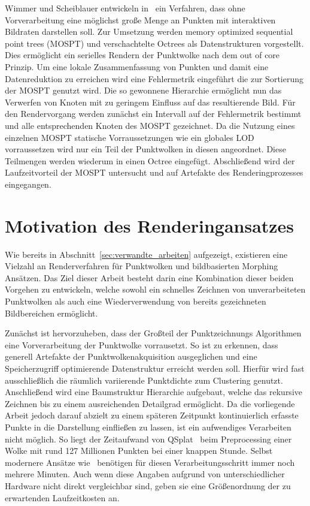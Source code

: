 \documentclass[hyperref, beleg, german]{cgvpub}
\begin{document}
Wimmer und Scheiblauer entwickeln in~\cite{wimmer2006instant} ein Verfahren,
dass ohne Vorverarbeitung eine möglichst große Menge an Punkten mit
interaktiven Bildraten darstellen soll. Zur Umsetzung werden memory optimized
sequential point trees (MOSPT) und verschachtelte Octrees als Datenstrukturen
vorgestellt. Dies ermöglicht ein serielles Rendern der Punktwolke nach dem out
of core Prinzip. Um eine lokale Zusammenfassung von Punkten und damit eine
Datenreduktion zu erreichen wird eine Fehlermetrik eingeführt die zur
Sortierung der MOSPT genutzt wird. Die so gewonnene Hierarchie ermöglicht nun
das Verwerfen von Knoten mit zu geringem Einfluss auf das resultierende Bild.
Für den Rendervorgang werden zunächst ein Intervall auf der Fehlermetrik
bestimmt und alle entsprechenden Knoten des MOSPT gezeichnet. Da die Nutzung
eines einzelnen MOSPT statische Vorraussetzungen wie ein globales LOD
vorraussetzen wird nur ein Teil der Punktwolken in diesen angeordnet. Diese
Teilmengen werden wiederum in einen Octree eingefügt. Abschließend wird der
Laufzeitvorteil der MOSPT untersucht und auf Artefakte des Renderingprozesses
eingegangen.

\section{Motivation des Renderingansatzes}

Wie bereits in Abschnitt~\ref{sec:verwandte_arbeiten} aufgezeigt, existieren
eine Vielzahl an Renderverfahren für Punktwolken und bildbasierten Morphing
Ansätzen. Das Ziel dieser Arbeit besteht darin eine Kombination dieser beiden
Vorgehen zu entwickeln, welche sowohl ein schnelles Zeichnen von
unverarbeiteten Punktwolken als auch eine Wiederverwendung von bereits
gezeichneten Bildbereichen ermöglicht.

Zunächst ist hervorzuheben, dass der Großteil der Punktzeichnungs Algorithmen
eine Vorverarbeitung der Punktwolke vorrausetzt. So ist zu erkennen, dass
generell Artefakte der Punktwolkenakquisition ausgeglichen und eine
Speicherzugriff optimierende Datenstruktur erreicht werden soll. Hierfür wird
fast ausschließlich die räumlich variierende Punktdichte zum Clustering
genutzt. Anschließend wird eine Baumstruktur Hierarchie aufgebaut, welche das
rekursive Zeichnen bis zu einem ausreichenden Detailgrad ermöglicht. Da die
vorliegende Arbeit jedoch darauf abzielt zu einem späteren Zeitpunkt
kontinuierlich erfasste Punkte in die Darstellung einfließen zu lassen, ist ein
aufwendiges Verarbeiten nicht möglich. So liegt der Zeitaufwand von
QSplat~\cite{rusinkiewicz2000qsplat} beim Preprocessing einer Wolke mit rund
127 Millionen Punkten bei einer knappen Stunde. Selbst modernere Ansätze
wie~\cite{goswami2010high} benötigen für diesen Verarbeitungsschritt immer noch
mehrere Minuten. Auch wenn diese Angaben aufgrund von unterschiedlicher
Hardware nicht direkt vergleichbar sind, geben sie eine Größenordnung der zu
erwartenden Laufzeitkosten an.
\end{document}
